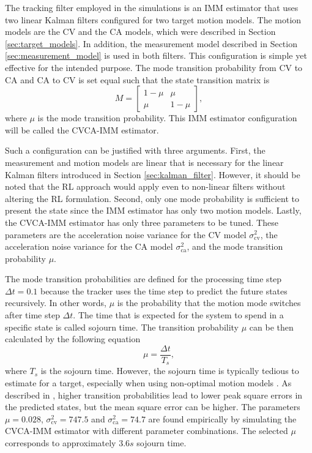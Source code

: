 \documentclass[english, 12pt, a4paper, elec, utf8, a-1b, online]{aaltothesis}
\newcommand{\varcv}{\sigma_\text{cv}^2}
\newcommand{\varca}{\sigma_\text{ca}^2}
\newcommand{\msp}{\mu}
\newcommand{\dt}{\Delta t}
\begin{document}
The tracking filter employed in the simulations is an IMM estimator that uses two linear Kalman filters configured for two target motion models.
The motion models are the CV and the CA models, which were described in Section \ref{sec:target_models}.
In addition, the measurement model described in Section \ref{sec:measurement_model} is used in both filters.
This configuration is simple yet effective for the intended purpose.
The mode transition probability from CV to CA and CA to CV is set equal such that the state transition matrix is
\begin{equation}
    M = 
\begin{bmatrix}
1 - \msp & \msp\\ 
\msp & 1 - \msp
\end{bmatrix},
\end{equation}
where $\msp$ is the mode transition probability.
This IMM estimator configuration will be called the CVCA-IMM estimator.

Such a configuration can be justified with three arguments.
First, the measurement and motion models are linear that is necessary for the linear Kalman filters introduced in Section \ref{sec:kalman_filter}.
However, it should be noted that the RL approach would apply even to non-linear filters without altering the RL formulation.
Second, only one mode probability is sufficient to present the state since the IMM estimator has only two motion models.
Lastly, the CVCA-IMM estimator has only three parameters to be tuned.
These parameters are the acceleration noise variance for the CV model $\varcv$, the acceleration noise variance for the CA model $\varca$, and the mode transition probability $\msp$.

The mode transition probabilities are defined for the processing time step $\dt=0.1$ because the tracker uses the time step to predict the future states recursively.
In other words, $\msp$ is the probability that the motion mode switches after time step $\dt$.
The time that is expected for the system to spend in a specific state is called sojourn time.
The transition probability $\msp$ can be then calculated by the following equation
\begin{equation}
   \msp = \frac{\dt}{T_s},
\end{equation}
where $T_s$ is the sojourn time.
However, the sojourn time is typically tedious to estimate for a target, especially when using non-optimal motion models \cite{Simeonova2002}.
As described in \cite{Simeonova2002}, higher transition probabilities lead to lower peak square errors in the predicted states, but the mean square error can be higher.
The parameters $\msp=0.028$, $\varcv=747.5$ and $\varca=74.7$ are found empirically by simulating the CVCA-IMM estimator with different parameter combinations.
The selected $\msp$ corresponds to approximately $3.6s$ sojourn time.
\end{document}
